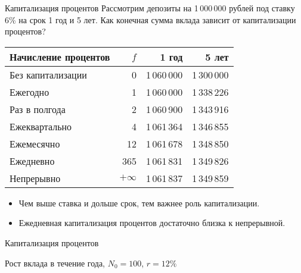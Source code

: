 \documentclass{beamer}
\begin{document}
\begin{frame}{Капитализация процентов}
\justify
Рассмотрим депозиты на 1\,000\,000 рублей под ставку 6\% на срок 1 год и 5 лет. Как конечная сумма вклада зависит от капитализации процентов?


\begin{table}
\centering
\begin{tabular}{l|r|r|r}
Начисление процентов & $f$ & 1 год & 5 лет \\ \hline
Без капитализации & 0         & 1\,060\,000 & 1\,300\,000 \\
Ежегодно          & 1         & 1\,060\,000 & 1\,338\,226 \\
Раз в полгода     & 2         & 1\,060\,900 & 1\,343\,916 \\
Ежеквартально     & 4         & 1\,061\,364 & 1\,346\,855 \\
Ежемесячно        & 12        & 1\,061\,678 & 1\,348\,850 \\
Ежедневно         & 365       & 1\,061\,831 & 1\,349\,826 \\
Непрерывно        & $+\infty$ & 1\,061\,837 & 1\,349\,859
\end{tabular}
\end{table}

\justifying
\vspace{\baselineskip}
\begin{itemize}
\justifying
\item Чем выше ставка и дольше срок, тем важнее роль капитализации.
\item Ежедневная капитализация процентов достаточно близка к непрерывной.
\end{itemize}
\end{frame}



\begin{frame}{Капитализация процентов}

	\centering
	\scriptsize{Рост вклада в течение года, $N_0=100$, $r=12\%$}
\end{frame}
\end{document}

